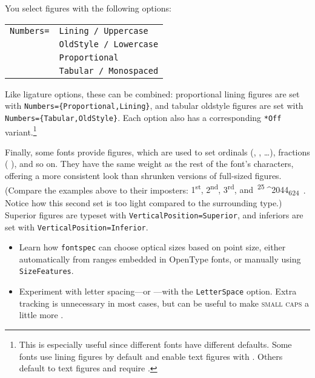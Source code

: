 You select figures with the following options:
\begin{leftfigure}
\begin{tabular}{l l}
\texttt{Numbers=} & \texttt{Lining / Uppercase} \\
 & \texttt{OldStyle / Lowercase} \\
 & \texttt{Proportional} \\
 & \texttt{Tabular / Monospaced}
\end{tabular}
\end{leftfigure}
Like ligature options, these can be combined:
proportional lining figures are set
with \texttt{Numbers=\allowbreak\{Proportional,\allowbreak Lining\}},
and tabular oldstyle figures are set with
\texttt{Numbers=\allowbreak\{Tabular,\allowbreak OldStyle\}}.
Each option also has a corresponding \verb|*Off|
variant.\punckern\footnote{This is especially useful since different fonts
have different defaults.
Some fonts use lining figures by default and enable text figures
with .
Others default to text figures and require .}

Finally, some fonts provide  figures,
which are used to set ordinals
(,  , \dots),
fractions (\,\,), and so on.
They have the same weight as the rest of the font's characters,
offering a more consistent look than shrunken versions of full-sized figures.
(Compare the examples above to their imposters:
{%
\mbox{1\textsuperscript{st}},
\mbox{2\textsuperscript{nd}},
\mbox{3\textsuperscript{rd}},
and
\,\mbox{\textsuperscript{25}^^^^2044\textsubscript{624}}%
\,}.
Notice how this second set is too light compared to the surrounding
type.)
Superior figures are typeset with
\texttt{VerticalPosition=\allowbreak Superior},
and inferiors are set with \texttt{VerticalPosition=\allowbreak Inferior}.

\exercises{}
\begin{itemize}
\item Learn how \texttt{fontspec} can choose optical sizes based on
    point size, either automatically from ranges embedded in OpenType fonts,
    or manually using \texttt{SizeFeatures}.
\item Experiment with letter spacing---or ---with
    the \texttt{LetterSpace} option.
    Extra tracking is unnecessary in most cases,
    but can be useful to make \textsc{small caps}
    a little more .
\end{itemize}
